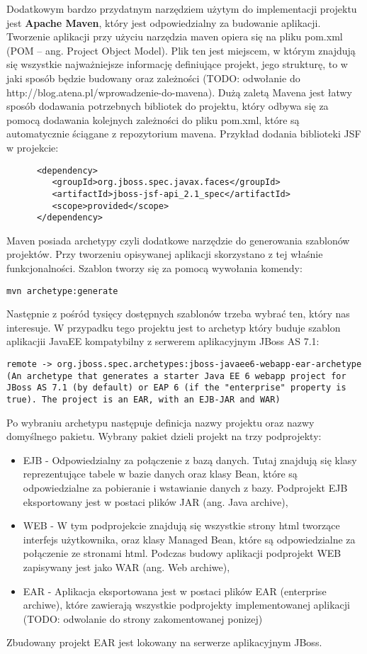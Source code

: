 Dodatkowym bardzo przydatnym narzędziem użytym do implementacji projektu jest \textbf{Apache Maven}, który jest odpowiedzialny za budowanie aplikacji. Tworzenie aplikacji przy użyciu narzędzia maven opiera się na pliku pom.xml (POM – ang. Project Object Model). Plik ten jest miejscem, w którym znajdują się wszystkie najważniejsze informację definiujące projekt, jego strukturę, to w jaki sposób będzie budowany oraz zależności (TODO: odwołanie do http://blog.atena.pl/wprowadzenie-do-mavena). Dużą zaletą Mavena jest łatwy sposób dodawania potrzebnych bibliotek do projektu, który odbywa się za pomocą dodawania kolejnych zależności do pliku pom.xml, które są automatycznie ściągane z repozytorium mavena. Przykład dodania biblioteki JSF w projekcie:
\begin{lstlisting}
      <dependency>
         <groupId>org.jboss.spec.javax.faces</groupId>
         <artifactId>jboss-jsf-api_2.1_spec</artifactId>
         <scope>provided</scope>
      </dependency>
\end{lstlisting}
Maven posiada archetypy czyli dodatkowe narzędzie do generowania szablonów projektów. Przy tworzeniu opisywanej aplikacji skorzystano z tej właśnie funkcjonalności. Szablon tworzy się za pomocą wywołania komendy:
\begin{lstlisting}
mvn archetype:generate 
\end{lstlisting}
Następnie z pośród tysięcy dostępnych szablonów trzeba wybrać ten, który nas interesuje. W przypadku tego projektu jest to archetyp który buduje szablon aplikacjii JavaEE kompatybilny z serwerem aplikacyjnym JBoss AS 7.1:
\begin{lstlisting}[breaklines=true]
remote -> org.jboss.spec.archetypes:jboss-javaee6-webapp-ear-archetype (An archetype that generates a starter Java EE 6 webapp project for JBoss AS 7.1 (by default) or EAP 6 (if the "enterprise" property is true). The project is an EAR, with an EJB-JAR and WAR)
\end{lstlisting}
Po wybraniu archetypu następuje definicja nazwy projektu oraz nazwy domyślnego pakietu. Wybrany pakiet dzieli projekt na trzy podprojekty: 
\begin{itemize}
	\item EJB - Odpowiedzialny za połączenie z bazą danych. Tutaj znajdują się klasy reprezentujące tabele w bazie danych oraz klasy Bean, które są odpowiedzialne za pobieranie i wstawianie danych z bazy. Podprojekt EJB eksportowany jest w postaci plików JAR (ang. Java archive),
	\item WEB - W tym podprojekcie znajdują się wszystkie strony html tworzące interfejs użytkownika, oraz klasy Managed Bean, które są odpowiedzialne za połączenie ze stronami html. Podczas budowy aplikacji podprojekt WEB zapisywany jest jako WAR (ang. Web archiwe),
	\item EAR - Aplikacja eksportowana jest w postaci plików EAR (enterprise archiwe), które zawierają wszystkie podprojekty implementowanej aplikacji (TODO: odwolanie do strony zakomentowanej ponizej)
\end{itemize}
Zbudowany projekt EAR jest lokowany na serwerze aplikacyjnym JBoss.\newline

